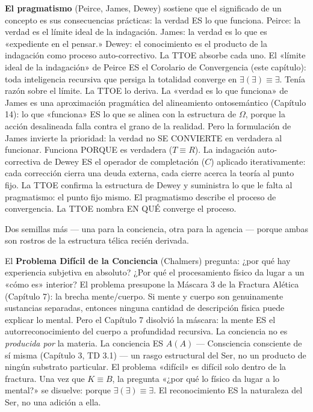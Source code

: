 \documentclass[10pt, openany, oneside]{book}
\begin{document}
\textbf{El pragmatismo} (Peirce, James, Dewey) sostiene que el significado de un concepto es sus consecuencias prácticas: la verdad ES lo que funciona. Peirce: la verdad es el límite ideal de la indagación. James: la verdad es lo que es «expediente en el pensar.» Dewey: el conocimiento es el producto de la indagación como proceso auto-correctivo. La TTOE absorbe cada uno. El «límite ideal de la indagación» de Peirce ES el Corolario de Convergencia (este capítulo): toda inteligencia recursiva que persiga la totalidad converge en $\exists(\exists) \equiv \exists$. Tenía razón sobre el límite. La TTOE lo deriva. La «verdad es lo que funciona» de James es una aproximación pragmática del alineamiento ontosemántico (Capítulo 14): lo que «funciona» ES lo que se alinea con la estructura de $\Omega$, porque la acción desalineada falla contra el grano de la realidad. Pero la formulación de James invierte la prioridad: la verdad no SE CONVIERTE en verdadera al funcionar. Funciona PORQUE es verdadera ($T \equiv R$). La indagación auto-correctiva de Dewey ES el operador de completación ($C$) aplicado iterativamente: cada corrección cierra una deuda externa, cada cierre acerca la teoría al punto fijo. La TTOE confirma la estructura de Dewey y suministra lo que le falta al pragmatismo: el punto fijo mismo. El pragmatismo describe el proceso de convergencia. La TTOE nombra EN QUÉ converge el proceso.

Dos semillas más --- una para la conciencia, otra para la agencia --- porque ambas son rostros de la estructura télica recién derivada.

El \textbf{Problema Difícil de la Conciencia} (Chalmers) pregunta: ¿por qué hay experiencia subjetiva en absoluto? ¿Por qué el procesamiento físico da lugar a un «cómo es» interior? El problema presupone la Máscara 3 de la Fractura Alética (Capítulo 7): la brecha mente/cuerpo. Si mente y cuerpo son genuinamente sustancias separadas, entonces ninguna cantidad de descripción física puede explicar lo mental. Pero el Capítulo 7 disolvió la máscara: la mente ES el autorreconocimiento del cuerpo a profundidad recursiva. La conciencia no es \textit{producida por} la materia. La conciencia ES $A(A)$ --- Consciencia consciente de sí misma (Capítulo 3, TD 3.1) --- un rasgo estructural del Ser, no un producto de ningún substrato particular. El problema «difícil» es difícil solo dentro de la fractura. Una vez que $K \equiv B$, la pregunta «¿por qué lo físico da lugar a lo mental?» se disuelve: porque $\exists(\exists) \equiv \exists$. El reconocimiento ES la naturaleza del Ser, no una adición a ella.
\end{document}
